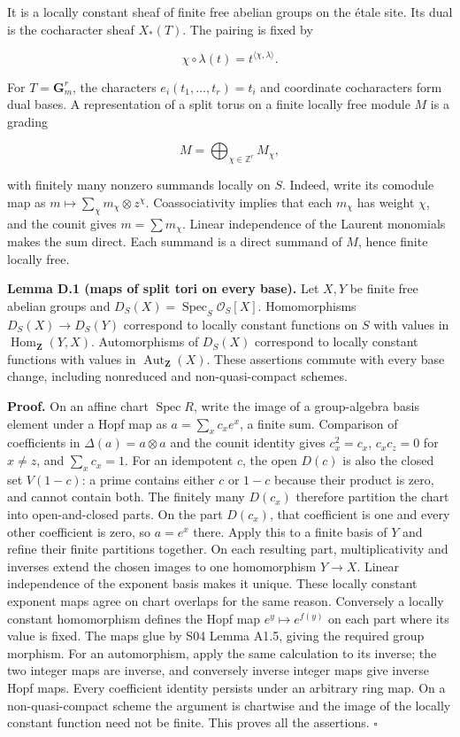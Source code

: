 \documentclass[11pt,a4paper,openany]{report}
\begin{document}
It is a locally constant sheaf of finite free abelian groups on the étale site. Its dual is the cocharacter sheaf \(X_*(T)\). The pairing is fixed by

\[
\chi\circ\lambda(t)=t^{\langle\chi,\lambda\rangle}.
\]

For \(T=\mathbf G_m^r\), the characters \(e_i(t_1,\ldots,t_r)=t_i\) and coordinate cocharacters form dual bases. A representation of a split torus on a finite locally free module \(M\) is a grading

\[
M=\bigoplus_{\chi\in\mathbb Z^r}M_\chi,
\]

with finitely many nonzero summands locally on \(S\). Indeed, write its comodule map as \(m\mapsto\sum_\chi m_\chi\otimes z^\chi\). Coassociativity implies that each \(m_\chi\) has weight \(\chi\), and the counit gives \(m=\sum m_\chi\). Linear independence of the Laurent monomials makes the sum direct. Each summand is a direct summand of \(M\), hence finite locally free.

\textbf{Lemma D.1 (maps of split tori on every base).} Let \(X,Y\) be finite free abelian groups and \(D_S(X)=\operatorname{Spec}_S\mathcal O_S[X]\). Homomorphisms \(D_S(X)\to D_S(Y)\) correspond to locally constant functions on \(S\) with values in \(\operatorname{Hom}_{\mathbf Z}(Y,X)\). Automorphisms of \(D_S(X)\) correspond to locally constant functions with values in \(\operatorname{Aut}_{\mathbf Z}(X)\). These assertions commute with every base change, including nonreduced and non-quasi-compact schemes.

\textbf{Proof.} On an affine chart \(\operatorname{Spec}R\), write the image of a group-algebra basis element under a Hopf map as \(a=\sum_x c_xe^x\), a finite sum. Comparison of coefficients in \(\Delta(a)=a\otimes a\) and the counit identity gives \(c_x^2=c_x\), \(c_xc_z=0\) for \(x\ne z\), and \(\sum_xc_x=1\). For an idempotent \(c\), the open \(D(c)\) is also the closed set \(V(1-c)\): a prime contains either \(c\) or \(1-c\) because their product is zero, and cannot contain both. The finitely many \(D(c_x)\) therefore partition the chart into open-and-closed parts. On the part \(D(c_x)\), that coefficient is one and every other coefficient is zero, so \(a=e^x\) there. Apply this to a finite basis of \(Y\) and refine their finite partitions together. On each resulting part, multiplicativity and inverses extend the chosen images to one homomorphism \(Y\to X\). Linear independence of the exponent basis makes it unique. These locally constant exponent maps agree on chart overlaps for the same reason. Conversely a locally constant homomorphism defines the Hopf map \(e^y\mapsto e^{f(y)}\) on each part where its value is fixed. The maps glue by S04 Lemma A1.5, giving the required group morphism. For an automorphism, apply the same calculation to its inverse; the two integer maps are inverse, and conversely inverse integer maps give inverse Hopf maps. Every coefficient identity persists under an arbitrary ring map. On a non-quasi-compact scheme the argument is chartwise and the image of the locally constant function need not be finite. This proves all the assertions. \(\square\)
\end{document}
